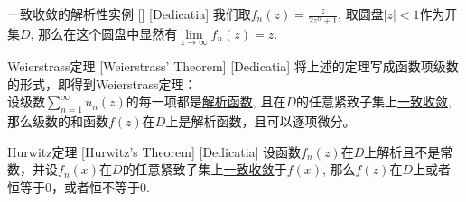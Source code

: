 \documentclass[UTF8]{ctexart}
\newcommand{\AnalyticalFunction}{\hyperref[dfn:AnalyticalFunction]{解析函数}}
\newcommand{\UniformConvergence}{\hyperref[dfn:UniformConvergence]{一致收敛}}
\begin{document}
\begin{xmp}
    [UUID]
    {一致收敛的解析性实例}
    []
    [Dedicatia]
    我们取$f_n(z)=\frac{z}{2z^n+1}$, 取圆盘$|z|<1$作为开集$D$, 那么在这个圆盘中显然有$\lim\limits_{z\to\infty}f_n(z)=z$.
\end{xmp}
\begin{thm}
    [UUID]
    {Weierstrass定理}
    [Weierstrass' Theorem]
    [Dedicatia]
    将上述的定理写成函数项级数的形式，即得到Weierstrass定理：\\
    设级数$\sum_{n = 1}^{\infty} u_n(z)$的每一项都是\AnalyticalFunction , 且在$D$的任意紧致子集上\UniformConvergence , 那么级数的和函数$f(z)$在$D$上是解析函数，且可以逐项微分。
\end{thm}
\begin{thm}
    [UUID]
    {Hurwitz定理}
    [Hurwitz's Theorem]
    [Dedicatia]
    设函数$f_n(z)$在$D$上解析且不是常数，并设$f_n(x)$在$D$的任意紧致子集上\UniformConvergence 于$f(x)$, 那么$f(z)$在$D$上或者恒等于0，或者恒不等于0.
\end{thm}
\end{document}
